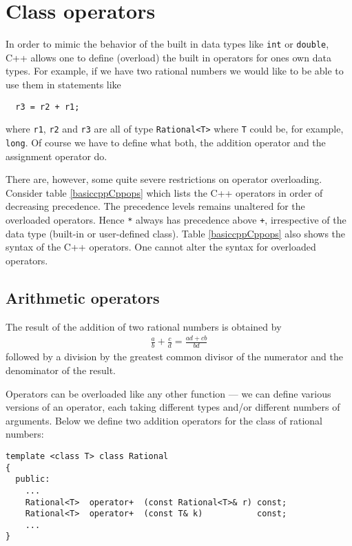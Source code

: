 
\section{Class operators\label{secADTTemplatesOperators}}

In order to mimic the behavior of the built in data types like
\verb+int+ or \verb+double+, C++ allows one to define (overload)
the built in operators for ones own data types. For example, if we
have two rational numbers we would like to be able to use them
in statements like
{\footnotesize \begin{verbatim}
  r3 = r2 + r1;
\end{verbatim}}
where \verb+r1+, \verb+r2+ and \verb+r3+ are all of type 
\verb+Rational<T>+ where \verb+T+ could be, for example, \verb+long+.
Of course we have to define what both, the addition operator and
the assignment operator do.

There are, however, some quite severe restrictions on operator overloading.
Consider table \ref{basiccppCppops} which lists the C++ operators in
order of decreasing precedence. The precedence levels remains unaltered
for the overloaded operators. Hence \verb+*+ always has precedence above
\verb&+&, irrespective of the data type (built-in or user-defined class).
Table \ref{basiccppCppops} also shows the syntax of the C++ operators.
One cannot alter the syntax for overloaded operators.


\subsection{Arithmetic operators}

The result of the addition of two rational numbers is obtained by
\begin{eqnarray}
  \frac{a}{b} + \frac{c}{d} = \frac{ad+cb}{bd}
\end{eqnarray}
followed by a division by the greatest common divisor of the numerator
and the denominator of the result.

Operators can be overloaded like any other function --- we can define
various versions of an operator, each taking different types and/or different
numbers of arguments. Below we define two addition operators for the
class of rational numbers:
{\footnotesize \begin{verbatim}
template <class T> class Rational
{
  public:
    ...
    Rational<T>  operator+  (const Rational<T>& r) const;
    Rational<T>  operator+  (const T& k)           const;
    ...
}
\end{verbatim}}

